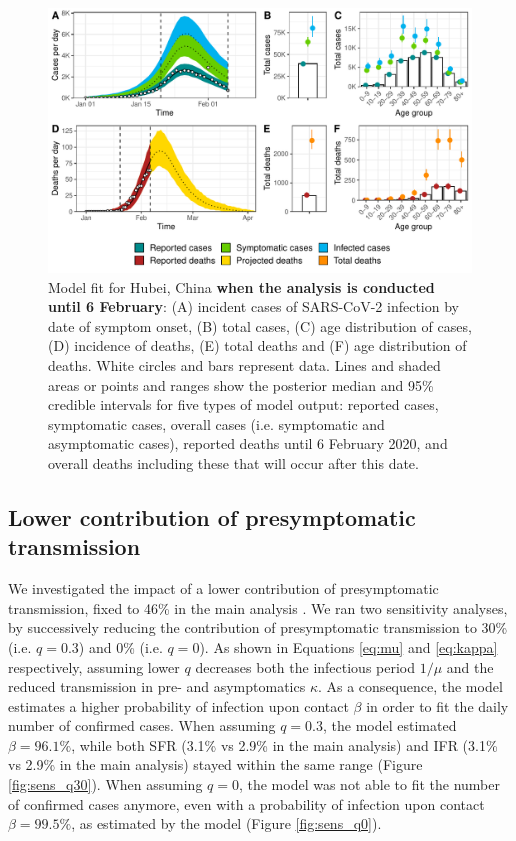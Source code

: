 \documentclass{article}
\begin{document}
\begin{figure}[H]
	\includegraphics[width=\linewidth]{../format_output/figures_v3/supp_fit_16F37.pdf}
	\caption{Model fit for Hubei, China \textbf{when the analysis is conducted until 6 February}: (A) incident cases of SARS-CoV-2 infection by date of symptom onset, (B) total cases, (C) age distribution of cases, (D) incidence of deaths, (E) total deaths and (F) age distribution of deaths. White circles and bars represent data. Lines and shaded areas or points and ranges show the posterior median and 95\% credible intervals for five types of model output: reported cases, symptomatic cases, overall cases (i.e. symptomatic and asymptomatic cases), reported deaths until 6 February 2020, and overall deaths including these that will occur after this date.}
	\label{fig:timesst2}
\end{figure}
\clearpage
\subsection{Lower contribution of presymptomatic transmission}
We investigated the impact of a lower contribution of presymptomatic transmission, fixed to 46\% in the main analysis \cite{ganyani2020estimating,liu2020,he2020temporal}.
We ran two sensitivity analyses, by successively reducing the contribution of presymptomatic transmission to 30\% (i.e. $q=0.3$) and 0\% (i.e. $q=0$).
As shown in Equations \ref{eq:mu} and \ref{eq:kappa} respectively, assuming lower $q$ decreases both the infectious period $1/\mu$ and the reduced transmission in pre- and asymptomatics $\kappa$.
As a consequence, the model estimates a higher probability of infection upon contact $\beta$ in order to fit the daily number of confirmed cases.
When assuming $q=0.3$, the model estimated $\beta = 96.1\%$, while both SFR (3.1\% vs 2.9\% in the main analysis) and IFR (3.1\% vs 2.9\% in the main analysis) stayed within the same range (Figure \ref{fig:sens_q30}).
When assuming $q=0$, the model was not able to fit the number of confirmed cases anymore, even with a probability of infection upon contact $\beta=99.5\%$, as estimated by the model (Figure \ref{fig:sens_q0}).
\end{document}
